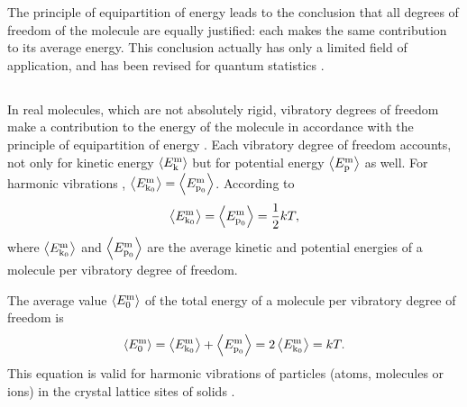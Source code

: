 The principle of equipartition of energy leads to the conclusion that all degrees of freedom of the molecule are equally justified: each makes the same contribution to its average energy. This conclusion actually has only a limited field of application, and has been revised for quantum statistics .

\subsection{}\label{10.6.5} In real molecules, which are not absolutely rigid, vibra­tory degrees of freedom make a contribution to the energy of the molecule in accordance with the principle of equipartition of energy . Each vibratory degree of freedom accounts, not only for kinetic energy $\expval{E_{\text{k}}^{\text{m}}}$ but for potential energy $\expval{E_{\text{p}}^{\text{m}}}$ as well. For harmonic vibrations , $\expval{E_{\text{k}_{0}}^{\text{m}}} = \expval{E_{\text{p}_{0}}^{\text{m}}}$. According to 
\begin{equation*}%
\expval{E_{\text{k}_{0}}^{\text{m}}} = \expval{E_{\text{p}_{0}}^{\text{m}}}  = \frac{1}{2}kT,
\end{equation*}
where $\expval{E_{\text{k}_{0}}^{\text{m}}}$ and $\expval{E_{\text{p}_{0}}^{\text{m}}}$ are the average kinetic and potential energies of a molecule per vibratory degree of freedom.

The average value $\expval{E_{0}^{\text{m}}}$ of the total energy of a molecule per vibratory degree of freedom is
\begin{equation*}%
\expval{E_{0}^{\text{m}}} = \expval{E_{\text{k}_{0}}^{\text{m}}} + \expval{E_{\text{p}_{0}}^{\text{m}}} = 2 \expval{E_{\text{k}_{0}}^{\text{m}}} = kT.
\end{equation*}
This equation is valid for harmonic vibrations of particles (atoms, molecules or ions) in the crystal lattice sites of sol­ids .

